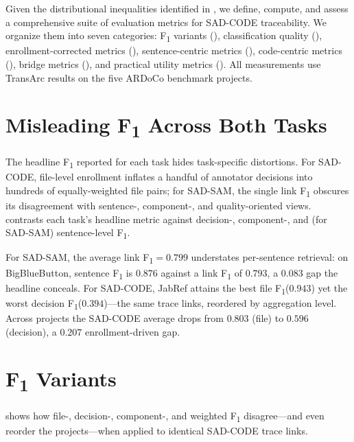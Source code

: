 \documentclass[11pt,a4paper]{report}
\newcommand{\sadcode}{SAD-CODE\xspace}
\newcommand{\sadsam}{SAD-SAM\xspace}
\newcommand{\transarc}{TransArc\xspace}
\newcommand{\fone}{F\textsubscript{1}\xspace}
\begin{document}
Given the distributional inequalities identified in , we
define, compute, and assess a comprehensive suite of evaluation metrics for
\sadcode traceability. We organize them into seven categories: \fone variants
(), classification quality (),
enrollment-corrected metrics (), sentence-centric
metrics (), code-centric metrics
(), bridge metrics (), and practical
utility metrics (). All measurements use \transarc
results on the five ARDoCo benchmark projects.


\section{Misleading \fone Across Both Tasks}
\label{sec:eval:misleading-both}

The headline \fone reported for each task hides task-specific distortions.
For \sadcode, file-level enrollment inflates a handful of annotator
decisions into hundreds of equally-weighted file pairs; for \sadsam, the
single link \fone obscures its disagreement with sentence-, component-, and
quality-oriented views.  contrasts each task's
headline metric against decision-, component-, and (for \sadsam)
sentence-level \fone.

For \sadsam, the average link \fone $=0.799$ understates per-sentence
retrieval: on BigBlueButton, sentence \fone is $0.876$ against a link \fone of
$0.793$, a $0.083$ gap the headline conceals. For \sadcode, JabRef attains
the best file \fone ($0.943$) yet the worst decision \fone ($0.394$)---the
same trace links, reordered by aggregation level. Across projects the
\sadcode average drops from $0.803$ (file) to $0.596$ (decision), a $0.207$
enrollment-driven gap.




\section{\fone Variants}

 shows how file-, decision-, component-, and weighted \fone disagree---and even reorder the projects---when applied to identical \sadcode trace links.
\end{document}
